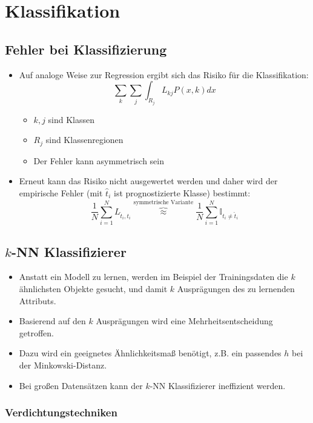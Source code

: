 \documentclass{scrartcl}
\begin{document}
\section{Klassifikation}

\subsection{Fehler bei Klassifizierung}

\begin{itemize}
	\item Auf analoge Weise zur Regression ergibt sich das Risiko für die 
	Klassifikation:
	\[ \sum_k \sum_j \int_{R_j} L_{kj} P(x,k) dx \]
	\begin{itemize}
		\item $ k,j $ sind Klassen
		\item $ R_j $ sind Klassenregionen
		\item Der Fehler kann asymmetrisch sein
	\end{itemize}
	\item Erneut kann das Risiko nicht ausgewertet werden und daher wird der 
	empirische Fehler (mit $ \hat{t}_i $ ist prognostizierte Klasse) bestimmt:
	\[ \frac{1}{N} \sum_{i=1}^{N} L_{\hat{t}_i, t_i} 
	\overbrace{\approx}^\text{symmetrische Variante} \frac{1}{N} \sum_{i=1}^{N} 
	\mathbb{I}_{t_i \neq \hat{t}_i} \]
\end{itemize}

\subsection{$ k $-NN Klassifizierer}

\begin{itemize}
	\item Anstatt ein Modell zu lernen, werden im Beispiel der Trainingsdaten 
	die $ k $ ähnlichsten Objekte gesucht, und damit $ k $ Ausprägungen des zu 
	lernenden Attributs.
	\item Basierend auf den $ k $ Ausprägungen wird eine Mehrheitsentscheidung 
	getroffen.
	\item Dazu wird ein geeignetes Ähnlichkeitsmaß benötigt, z.B. ein passendes 
	$ h $ bei der Minkowski-Distanz.
	\item Bei großen Datensätzen kann der $ k $-NN Klassifizierer ineffizient 
	werden.
\end{itemize}

\subsubsection{Verdichtungstechniken}
\end{document}
